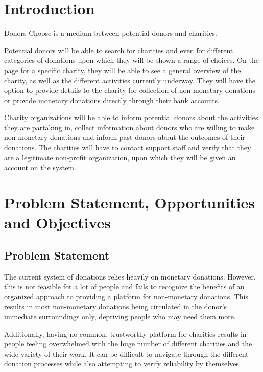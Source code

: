 \documentclass{scrreprt}
\date{}
\begin{document}
\tableofcontents

\chapter{Introduction}

    Donors Choose is a medium between potential donors and charities.\par
    
    Potential donors will be able to search for charities and even for different categories of donations upon which they will be shown a range of choices. On the page for a specific charity, they will be able to see a general overview of the charity, as well as the different activities currently underway. They will have the option to provide details to the charity for collection of non-monetary donations or provide monetary donations directly through their bank accounts.\par
    
    Charity organizations will be able to inform potential donors about the activities they are partaking in, collect information about donors who are willing to make non-monetary donations and inform past donors about the outcomes of their donations. The charities will have to contact support staff and verify that they are a legitimate non-profit organization, upon which they will be given an account on the system.


\chapter{Problem Statement, Opportunities and Objectives}

    \section{Problem Statement}
        
        The current system of donations relies heavily on monetary donations. However, this is not feasible for a lot of people and fails to recognize the benefits of an organized approach to providing a platform for non-monetary donations. This results in most non-monetary donations being circulated in the donor's immediate surroundings only, depriving people who may need them more.\par
        
        Additionally, having no common, trustworthy platform for charities results in people feeling overwhelmed with the huge number of different charities and the wide variety of their work. It can be difficult to navigate through the different donation processes while also attempting to verify reliability by themselves.
        
\end{document}
